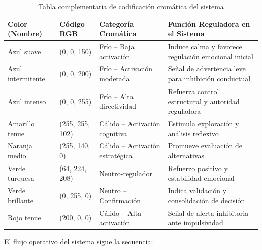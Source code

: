 \documentclass{book}
\begin{document}
\begin{table}[ht]
\centering
\caption{Tabla complementaria de codificación cromática del sistema}
\renewcommand{\arraystretch}{1.2}
\begin{tabular}{|p{3cm}|p{3cm}|p{3cm}|p{4cm}|}
\hline
\textbf{Color (Nombre)} & \textbf{Código RGB} & \textbf{Categoría Cromática} & \textbf{Función Reguladora en el Sistema} \\
\hline

Azul suave 
& (0, 0, 150) 
& Frío – Baja activación 
& Induce calma y favorece regulación emocional inicial \\

\hline

Azul intermitente 
& (0, 0, 200) 
& Frío – Activación moderada 
& Señal de advertencia leve para inhibición conductual \\

\hline

Azul intenso 
& (0, 0, 255) 
& Frío – Alta directividad 
& Refuerza control estructural y autoridad reguladora \\

\hline

Amarillo tenue 
& (255, 255, 102) 
& Cálido – Activación cognitiva 
& Estimula exploración y análisis reflexivo \\

\hline

Naranja medio 
& (255, 140, 0) 
& Cálido – Activación estratégica 
& Promueve evaluación de alternativas \\

\hline

Verde turquesa 
& (64, 224, 208) 
& Neutro-regulador 
& Refuerzo positivo y estabilidad emocional \\

\hline

Verde brillante 
& (0, 255, 0) 
& Neutro – Confirmación 
& Indica validación y consolidación de decisión \\

\hline

Rojo tenue 
& (200, 0, 0) 
& Cálido – Alta activación 
& Señal de alerta inhibitoria ante impulsividad \\

\hline

\end{tabular}
\end{table}



El flujo operativo del sistema sigue la secuencia:
\end{document}
